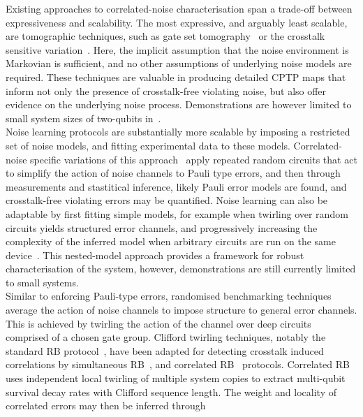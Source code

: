 Existing approaches to correlated-noise characterisation span a trade-off
between expressiveness and scalability. The most expressive, and arguably least scalable, are tomographic techniques, such as gate set tomography~\cite{nielsen_gate_2021} or the crosstalk sensitive variation~\cite{rudinger_experimental_2021}. Here, the implicit assumption that the noise environment is Markovian is sufficient, and no other assumptions of underlying noise models are required. These techniques are valuable in producing detailed CPTP maps that inform not only the presence of crosstalk-free violating noise, but also offer evidence on the underlying noise process. Demonstrations are however limited to small system sizes of two-qubits in~\cite{rudinger_experimental_2021}.\\
Noise learning protocols are substantially more scalable by imposing a restricted set of noise models, and fitting experimental data to these models. Correlated-noise specific variations of this approach~\cite{harper_efficient_2020,harper_learning_2023} apply repeated random circuits that act to simplify the action of noise channels to Pauli type errors, and then through measurements and stastitical inference, likely Pauli error models are found, and crosstalk-free violating errors may be quantified. Noise learning can also be adaptable by first fitting simple models, for example when twirling over random circuits yields structured error channels, and progressively increasing the complexity of the inferred model when arbitrary circuits are run on the same device~\cite{nielsen_efficient_2021}. This nested-model approach provides a framework for robust characterisation of the system, however, demonstrations are still currently limited to small systems. \\
Similar to enforcing Pauli-type errors, randomised benchmarking techniques average the action of noise channels to impose structure to general error channels. This is achieved by twirling the action of the channel over deep circuits comprised of a chosen gate group. Clifford twirling techniques, notably the standard RB protocol~\cite{magesan_scalable_2011,knill_randomized_2008,dankert_exact_2009}, have been adapted for detecting crosstalk induced correlations by simultaneous RB~\cite{gambetta_characterization_2012}, and correlated RB~\cite{mckay_correlated_2020} protocols.
Correlated RB uses independent local twirling of multiple system copies to extract multi-qubit survival decay rates with Clifford sequence length. The weight and locality of correlated errors may then be inferred through
